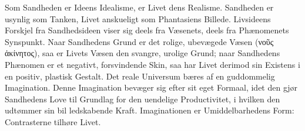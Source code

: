\documentclass[12pt]{book}
\newcommand{\opage}[1]{\marginnote{\footnotesize\textit{[#1]}}}
\begin{document}
Som Sandheden er Ideens Idealisme, er Livet dens Realisme. Sandheden er usynlig som
Tanken, Livet anskueligt som Phantasiens Billede. Livsideens Forskjel fra
Sandhedsideen viser sig deels fra Væsenets, deels fra Phænomenets Synspunkt. Naar
Sandhedens Grund er det rolige, ubevægede Væsen (νοῦς ἀκίνητος), saa er Livets Væsen
den svangre, urolige Grund; naar Sandhedens Phænomen er et negativt, forsvindende
Skin, saa har Livet derimod sin Existens i en positiv, plastisk Gestalt. Det reale
Universum bæres af en guddommelig Imagination. Denne Imagination bevæger sig efter sit
eget Formaal, idet den gjør Sandhedens Love til Grundlag for den uendelige
Productivitet, i hvilken den udtømmer sin bil%
\opage{253}%
ledskabende Kraft. Imaginationen er Umiddelbarhedens Form: Contrasterne tilhøre Livet.
\end{document}
